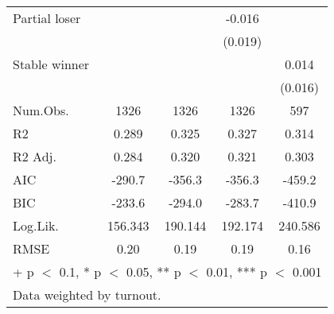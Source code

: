 \begin{table}
\begin{tabular}[t]{lcccc}
Partial loser &  &  & -0.016 & \\
 &  &  & (0.019) & \\
Stable winner &  &  &  & 0.014\\
 &  &  &  & (0.016)\\
\midrule
Num.Obs. & 1326 & 1326 & 1326 & 597\\
R2 & 0.289 & 0.325 & 0.327 & 0.314\\
R2 Adj. & 0.284 & 0.320 & 0.321 & 0.303\\
AIC & -290.7 & -356.3 & -356.3 & -459.2\\
BIC & -233.6 & -294.0 & -283.7 & -410.9\\
Log.Lik. & 156.343 & 190.144 & 192.174 & 240.586\\
RMSE & 0.20 & 0.19 & 0.19 & 0.16\\
\bottomrule
\multicolumn{5}{l}{\rule{0pt}{1em}+ p $<$ 0.1, * p $<$ 0.05, ** p $<$ 0.01, *** p $<$ 0.001}\\
\multicolumn{5}{l}{\rule{0pt}{1em}Data weighted by turnout.}\\
\end{tabular}
\end{table}
